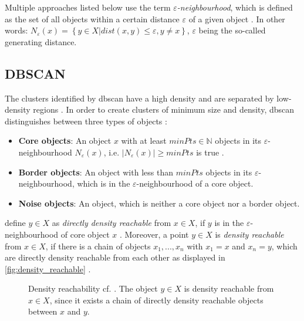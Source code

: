 Multiple approaches listed below use the term \textit{$\varepsilon$-neighbourhood}, which is defined as the set of all objects within a certain distance $\varepsilon$ of a given object \cite{OPTICS2013}.
In other words: $N_\varepsilon (x) = \left\{ y \in X | dist(x,y) \le \varepsilon, y \neq x \right\}$, $\varepsilon$ being the so-called generating distance.


%


\subsection{DBSCAN}\label{subsec:dbscan}

The clusters identified by \ac{dbscan} have a high density and are separated by low-density regions \cite{OPTICS_kMeans_2016}.
In order to create clusters of minimum size and density, \ac{dbscan} distinguishes between three types of objects \cite{OPTICS_kMeans_2016}:

\begin{itemize}
    \item \textbf{Core objects}: 
    An object $x$ with at least $minPts \in \mathbb{N}$ objects in its $\varepsilon$-neighbourhood $N_\varepsilon(x)$, i.e. $| N_\varepsilon (x) | \geq minPts$ is true \cite{OPTICS2013}.

    \item \textbf{Border objects}: 
    An object with less than $minPts$ objects in its $\varepsilon$-neighbourhood, which is in the $\varepsilon$-neighbourhood of a core object.

    \item \textbf{Noise objects}: 
    An object, which is neither a core object nor a border object.
\end{itemize}

\citeauthor{OPTICS_kMeans_2016} define $y \in X$ as \textit{directly density reachable} from $x \in X$, if $y$ is in the $\varepsilon$-neighbourhood of core object $x$ \cite{OPTICS_kMeans_2016}.
Moreover, a point $y \in X$ is \textit{density reachable} from $x \in X$, if there is a chain of objects $x_1, ..., x_n$ with $x_1 = x$ and $x_n = y$, 
which are directly density reachable from each other as displayed in \autoref{fig:density_reachable} \cite{OPTICS_kMeans_2016}.

\begin{figure}[htp] %
    \centering
    
    \caption[Density reachability]{Density reachability cf. \cite{OPTICS1999}.
    The object $y \in X$ is density reachable from $x \in X$, since it exists a chain of directly density reachable objects between $x$ and $y$.
    }
    \label{fig:density_reachable}
\end{figure}

